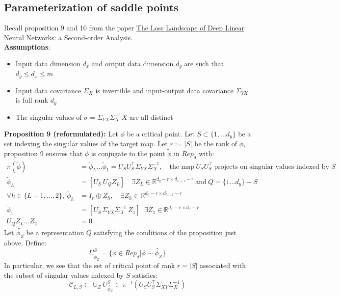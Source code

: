 \documentclass{article}
\theoremstyle{definition}
\begin{document}
\subsection*{Parameterization of saddle points}
Recall proposition 9 and 10 from the paper \href{https://arxiv.org/pdf/2107.13289}{The Loss Landscape of Deep Linear Neural Networks: a Second-order
Analysis}.
\\
\textbf{Assumptions}:
\begin{itemize}
    \item Input data dimension $d_x$ and output data dimension $d_y$ are such that $d_y \leq d_x \leq m$
    \item Input data covariance $\Sigma_X$ is invertible and input-output data covariance $\Sigma_{YX}$ is full rank $d_y$
    \item The singular values of $\sigma = \Sigma_{YX}\Sigma_{X}^{-1}X$ are all distinct
\end{itemize}
\textbf{Proposition 9 (reformulated):}
Let $\phi$ be a critical point. Let $S\subset \{1,...d_y\}$ be a set indexing the singular values of the target map. Let $r:=|S|$ be the rank of $\phi$, proposition 9 ensures that $\phi$ is conjugate to the point $\tilde{\phi}$ in $Rep_d$ with:
\begin{align*}
    \pi(\tilde{\phi}) & = \tilde{\phi}_L...\tilde{\phi}_1 = U_SU_S^{\top}\Sigma_{YX}\Sigma_{X}^{-1}, \quad \text{the map} \ U_SU_S^{\top} \ \text{projects on singular values indexed by } S \\
    \tilde{\phi}_L & = [U_S \ U_QZ_L ] \quad \exists Z_L\in\mathbb{R}^{d_y-r \times d_{L-1} - r} \ \text{and} \ Q=\{1...d_y\} - S\\
    \forall h\in\{L-1,...,2\}, \ \tilde{\phi}_h & = I_r \oplus Z_h,  \quad \exists Z_h\in\mathbb{R}^{d_h-r \times d_{h-1} - r}\\
    \tilde{\phi}_1 & = [U_S^{\top}\Sigma_{YX}\Sigma_{X}^{-1} \ Z_1]^{\top} \exists Z_1\in\mathbb{R}^{d_1-r \times d_{0} - r}\\
    U_QZ_L...Z_2 & = 0
\end{align*}
Let $\tilde{\phi_Z}$ be a representation $Q$ satisfying the conditions of the proposition just above. Define:
\begin{equation*}
    U_{\tilde{\phi}_Z}^S = \{\phi\in Rep_d|\phi \sim \tilde{\phi_Z}\}
\end{equation*}
In particular, we see that the set of critical point of rank $r=|S|$ associated with the subset of singular values indexed by $S$ satisfies: $$\mathcal{C}_{L,S} \subset \cup_Z U_{\tilde{\phi_Z}}^S \subset \pi^{-1}(U_SU_S^{\top}\Sigma_{XY}\Sigma_{X}^{-1}) $$
\end{document}
